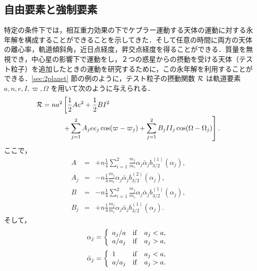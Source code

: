 \documentclass[11pt,a4paper,oneside,onecolumn]{jarticle}
\begin{document}
\subsection{自由要素と強制要素}
特定の条件下では，相互重力効果の下でケプラー運動する天体の運動に対する永年解を構成することができることを示してきた．そして任意の時間に両方の天体の離心率，軌道傾斜角，近日点経度，昇交点経度を得ることができる．質量を無視でき，中心星の影響下で運動をし，２つの惑星からの摂動を受ける天体（テスト粒子）を追加したときの運動を研究するために，この永年解を利用することができる．\ref{sec:2planet} 節の例のように，テスト粒子の摂動関数 ${\cal R}$ は軌道要素 $a, n, e, I, \varpi, \Omega$ を用いて次のように与えられる．
\begin{equation}
\begin{split}
{\cal R} = n a^2 & \left[ \frac{1}{2} A e^2 + \frac{1}{2} B I^2 \right. \\
& \left. + \sum_{j = 1}^2  A_j e e_j \cos (\varpi - \varpi_j) + \sum_{j = 1}^2 B_j I I_j \cos (\Omega - \Omega_j) \right]. \\
\end{split} \label{}
\end{equation} 
ここで，
\begin{eqnarray}
A & = & + n \frac{1}{4} \sum_{i = 1}^2 \frac{m_j}{m_c} \alpha_j \bar{\alpha}_j b_{3/2}^{(1)} (\alpha_j), \label{eq:A_test} \\
A_j & = & - n \frac{1}{4} \frac{m_j}{m_c} \alpha_j \bar{\alpha}_j b_{3/2}^{(2)} (\alpha_j), \label{eq:A_j_test} \\
B & = & - n \frac{1}{4} \sum_{i = 1}^2 \frac{m_j}{m_c} \alpha_j \bar{\alpha}_j b_{3/2}^{(1)} (\alpha_j), \label{eq:B_test} \\
B_j & = & + n \frac{1}{4} \frac{m_j}{m_c} \alpha_j \bar{\alpha}_j b_{3/2}^{(1)} (\alpha_j). \label{eq:B_j_test}
\end{eqnarray}
そして，
\begin{equation}
\alpha_j = \left\{
\begin{array}{lll}
a_j / a & {\rm if} & a_j < a, \\
a / a_j & {\rm if} & a_j > a,
\end{array}
\right.
\end{equation}
\begin{equation}
\bar{\alpha}_j = \left\{
\begin{array}{lll}
1 & {\rm if} & a_j < a, \\
a / a_j & {\rm if} & a_j > a.
\end{array}
\right.
\end{equation}
\end{document}
